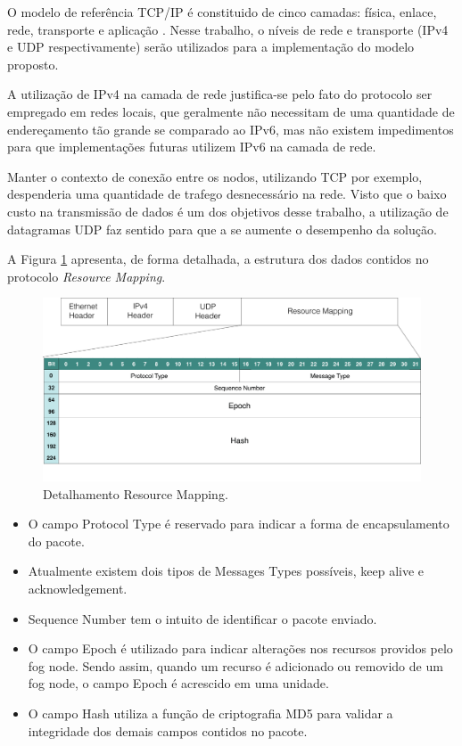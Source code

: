 O modelo de referência TCP/IP é constituido de cinco camadas: física, enlace, rede, transporte e aplicação \cite{tanenbaum2011redes}.
Nesse trabalho, o níveis de rede e transporte (IPv4 e UDP respectivamente) serão utilizados para a implementação do modelo proposto.

A utilização de IPv4 na camada de rede justifica-se pelo fato do protocolo ser empregado em redes locais, que geralmente não necessitam de uma quantidade de endereçamento tão grande 
se comparado ao IPv6, mas não existem impedimentos para que implementações futuras utilizem IPv6 na camada de rede.

Manter o contexto de conexão entre os nodos, utilizando TCP por exemplo, despenderia uma quantidade de trafego desnecessário na rede.
Visto que o baixo custo na transmissão de dados é um dos objetivos desse trabalho, a utilização de datagramas UDP faz sentido para que a se aumente o desempenho da solução.

A Figura \ref{fig:fig12} apresenta, de forma detalhada, a estrutura dos dados contidos no protocolo \textit{Resource Mapping}.

\begin{figure}[htb!]
    \centering\includegraphics[width=.8\textwidth]{fig12.png}
    \caption[Detalhamento Resource Mapping]
    {\label{fig:fig12} Detalhamento Resource Mapping.}
\end{figure}

\begin{itemize}
\item O campo Protocol Type é reservado para indicar a forma de encapsulamento do pacote.
\item Atualmente existem dois tipos de Messages Types possíveis, keep alive e acknowledgement.
\item Sequence Number tem o intuito de identificar o pacote enviado.
\item O campo Epoch é utilizado para indicar alterações nos recursos providos pelo fog node.
Sendo assim, quando um recurso é adicionado ou removido de um fog node, o campo Epoch é acrescido em uma unidade.
\item O campo Hash utiliza a função de criptografia MD5 para validar a integridade dos demais campos contidos no pacote.
\end{itemize}

